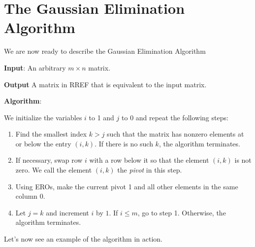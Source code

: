 \documentclass[12pt]{article}
\begin{document}
\section{The Gaussian Elimination Algorithm}
We are now ready to describe the Gaussian Elimination Algorithm

\textbf{Input}: An arbitrary $m\times n$ matrix.

\textbf{Output} A matrix in RREF that is equivalent to the input matrix.

\textbf{Algorithm}:

We initialize the variables $i$ to 1 and $j$ to $0$ and repeat the following steps:

\begin{enumerate}
\item Find the smallest index $k>j$ such that the matrix has nonzero elements at or below the entry $(i,k)$. If there is no such $k$, the algorithm terminates.
\item If necessary, swap row $i$ with a row below it so that the element $(i,k)$ is not zero. We call the element $(i,k)$ the \emph{pivot} in this step.
\item Using EROs, make the current pivot 1 and all other elements in the same column 0.
\item Let $j=k$ and increment $i$ by $1$. If $i\le m$, go to step 1. Otherwise, the algorithm terminates. 
\end{enumerate}
Let's now see an example of the algorithm in action.
\end{document}
